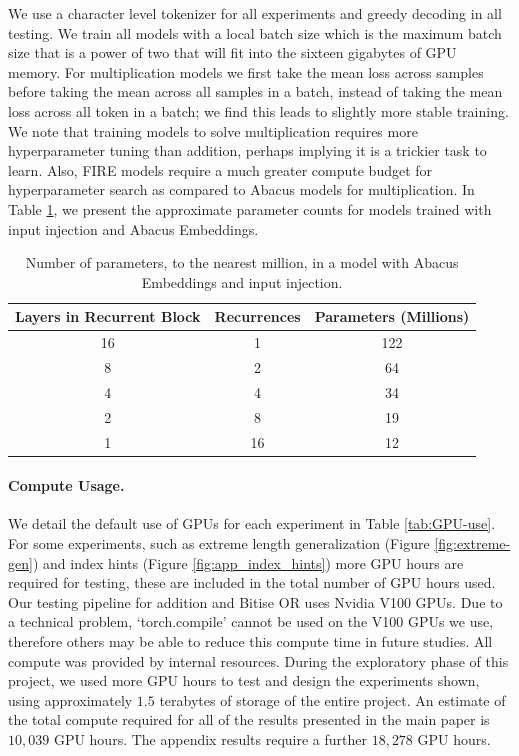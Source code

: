 \documentclass{article}
\begin{document}
We use a character level tokenizer for all experiments and greedy decoding in all testing.
We train all models with a local batch size which is the maximum batch size that is a power of two that will fit into the sixteen gigabytes of GPU memory.
For multiplication models we first take the mean loss across samples before taking the mean across all samples in a batch, instead of taking the mean loss across all token in a batch; we find this leads to slightly more stable training.
We note that training models to solve multiplication requires more hyperparameter tuning than addition, perhaps implying it is a trickier task to learn.
Also, FIRE models require a much greater compute budget for hyperparameter search as compared to Abacus models for multiplication.
In Table \ref{tab:param_count}, we present the approximate parameter counts for models trained with input injection and Abacus Embeddings.

\begin{table}
    \centering
    \caption{Number of parameters, to the nearest million, in a model with Abacus Embeddings and input injection.}
    \begin{tabular}{ccc} 
    \toprule
         Layers in Recurrent Block & Recurrences &  Parameters (Millions)\\ 
         \midrule
         16&  1& 122\\ 
         8&  2& 64\\ 
         4&  4& 34\\ 
         2&  8& 19\\ 
         1&  16& 12\\
         \bottomrule
    \end{tabular}
    \label{tab:param_count}
\end{table}


\paragraph{Compute Usage.}
We detail the default use of GPUs for each experiment in Table \ref{tab:GPU-use}.
For some experiments, such as extreme length generalization (Figure \ref{fig:extreme-gen}) and index hints (Figure \ref{fig:app_index_hints}) more GPU hours are required for testing, these are included in the total number of GPU hours used.
Our testing pipeline for addition and Bitise OR uses Nvidia V100 GPUs.
Due to a technical problem, `torch.compile' cannot be used on the V100 GPUs we use, therefore others may be able to reduce this compute time in future studies.
All compute was provided by internal resources.
During the exploratory phase of this project, we used more GPU hours to test and design the experiments shown, using approximately \(1.5\) terabytes of storage of the entire project.
An estimate of the total compute required for all of the results presented in the main paper is \(10,039\) GPU hours.
The appendix results require a further \(18,278\) GPU hours.
\end{document}
